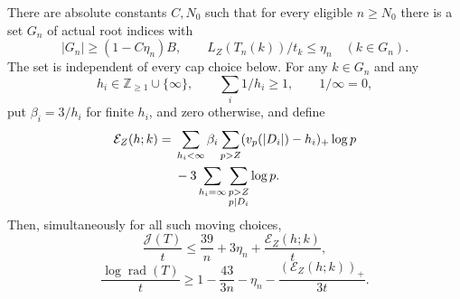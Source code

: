 \begin{theorem}\label{lcs-common-set}
There are absolute constants $C,N_0$ such that for every eligible
$n\ge N_0$ there is a set $G_n$ of actual root indices with
\begin{equation}\label{lcs-good-set}
 |G_n|\ge(1-C\eta_n)B,\qquad
 L_Z(T_n(k))/t_k\le\eta_n\quad(k\in G_n).
\end{equation}
The set is independent of every cap choice below. For any $k\in G_n$
and any
\[
 h_i\in\mathbb Z_{\ge1}\cup\{\infty\},\qquad
 \sum_i1/h_i\ge1,\qquad 1/\infty=0,
\]
put $\beta_i=3/h_i$ for finite $h_i$, and zero otherwise, and define
\begin{align}
 \mathcal E_Z(h;k)={}&
 \sum_{h_i<\infty}\beta_i
       \sum_{p>Z}(v_p(|D_i|)-h_i)_+\log p
 \label{lcs-net-budget}\\
 &-3\sum_{h_i=\infty}\sum_{\substack{p>Z\\p\mid D_i}}\log p.
 \notag
\end{align}
Then, simultaneously for all such moving choices,
\begin{equation}\label{lcs-global-cost}
 \frac{\mathcal J(T)}t
 \le\frac{39}{n}+3\eta_n+\frac{\mathcal E_Z(h;k)}t,
\end{equation}
\begin{equation}\label{lcs-radical}
 \frac{\log\operatorname{rad}(T)}t
 \ge1-\frac{43}{3n}-\eta_n-\frac{(\mathcal E_Z(h;k))_+}{3t}.
\end{equation}
\end{theorem}
